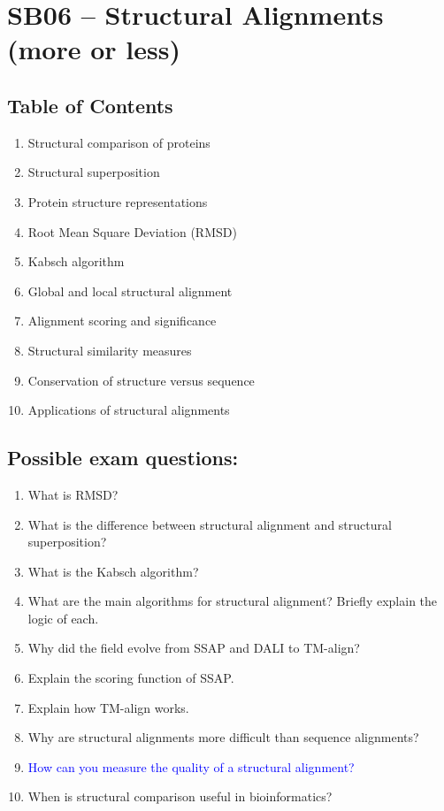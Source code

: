 \section{SB06 -- Structural Alignments \done (more or less)}

\subsection*{Table of Contents}

\begin{enumerate}
\item Structural comparison of proteins
\item Structural superposition
\item Protein structure representations
\item Root Mean Square Deviation (RMSD)
\item Kabsch algorithm
\item Global and local structural alignment
\item Alignment scoring and significance
\item Structural similarity measures
\item Conservation of structure versus sequence
\item Applications of structural alignments
\end{enumerate}

\subsection*{Possible exam questions:}

\begin{enumerate}
\item{What is RMSD? \done}
\item{What is the difference between structural alignment and structural superposition? \done}
\item{What is the Kabsch algorithm? \done}
\vspace*{0.5cm}
\item{What are the main algorithms for structural alignment? Briefly explain the logic of each.}
\item {Why did the field evolve from SSAP and DALI to TM-align?}
\item{Explain the scoring function of SSAP. \done}
\item {Explain how TM-align works. \done}
\vspace*{0.5cm}
\item{Why are structural alignments more difficult than sequence alignments?}
\item{\textcolor{blue}{How can you measure the quality of a structural alignment?} \done}
\item{When is structural comparison useful in bioinformatics?}
\end{enumerate}

